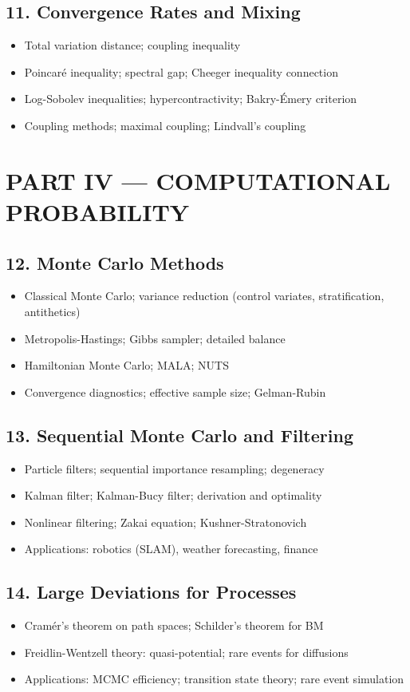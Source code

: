 \subsection{11. Convergence Rates and Mixing}
\begin{itemize}
\item Total variation distance; coupling inequality
\item Poincar\'e inequality; spectral gap; Cheeger inequality connection
\item Log-Sobolev inequalities; hypercontractivity; Bakry-\'Emery criterion
\item Coupling methods; maximal coupling; Lindvall's coupling
\end{itemize}

\section{PART IV --- COMPUTATIONAL PROBABILITY}

\subsection{12. Monte Carlo Methods}
\begin{itemize}
\item Classical Monte Carlo; variance reduction (control variates, stratification, antithetics)
\item Metropolis-Hastings; Gibbs sampler; detailed balance
\item Hamiltonian Monte Carlo; MALA; NUTS
\item Convergence diagnostics; effective sample size; Gelman-Rubin
\end{itemize}

\subsection{13. Sequential Monte Carlo and Filtering}
\begin{itemize}
\item Particle filters; sequential importance resampling; degeneracy
\item Kalman filter; Kalman-Bucy filter; derivation and optimality
\item Nonlinear filtering; Zakai equation; Kushner-Stratonovich
\item Applications: robotics (SLAM), weather forecasting, finance
\end{itemize}

\subsection{14. Large Deviations for Processes}
\begin{itemize}
\item Cram\'er's theorem on path spaces; Schilder's theorem for BM
\item Freidlin-Wentzell theory: quasi-potential; rare events for diffusions
\item Applications: MCMC efficiency; transition state theory; rare event simulation
\end{itemize}

